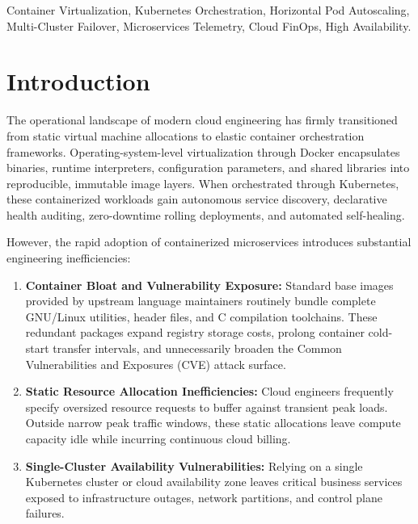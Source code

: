 \documentclass[conference]{IEEEtran}
\begin{document}
\begin{IEEEkeywords}
Container Virtualization, Kubernetes Orchestration, Horizontal Pod Autoscaling, Multi-Cluster Failover, Microservices Telemetry, Cloud FinOps, High Availability.
\end{IEEEkeywords}

\section{Introduction}

The operational landscape of modern cloud engineering has firmly transitioned from static virtual machine allocations to elastic container orchestration frameworks. Operating-system-level virtualization through Docker encapsulates binaries, runtime interpreters, configuration parameters, and shared libraries into reproducible, immutable image layers. When orchestrated through Kubernetes, these containerized workloads gain autonomous service discovery, declarative health auditing, zero-downtime rolling deployments, and automated self-healing.

However, the rapid adoption of containerized microservices introduces substantial engineering inefficiencies:
\begin{enumerate}
    \item \textbf{Container Bloat and Vulnerability Exposure:} Standard base images provided by upstream language maintainers routinely bundle complete GNU/Linux utilities, header files, and C compilation toolchains. These redundant packages expand registry storage costs, prolong container cold-start transfer intervals, and unnecessarily broaden the Common Vulnerabilities and Exposures (CVE) attack surface.
    \item \textbf{Static Resource Allocation Inefficiencies:} Cloud engineers frequently specify oversized resource requests to buffer against transient peak loads. Outside narrow peak traffic windows, these static allocations leave compute capacity idle while incurring continuous cloud billing.
    \item \textbf{Single-Cluster Availability Vulnerabilities:} Relying on a single Kubernetes cluster or cloud availability zone leaves critical business services exposed to infrastructure outages, network partitions, and control plane failures.
\end{enumerate}
\end{document}
